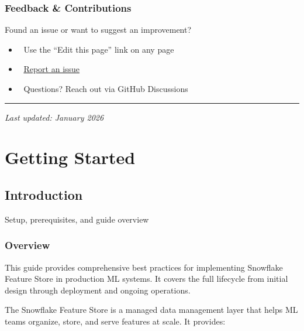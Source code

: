 \documentclass[
  letterpaper,
  DIV=11,
  numbers=noendperiod]{scrreprt}
\providecommand{\tightlist}{%
  \setlength{\itemsep}{0pt}\setlength{\parskip}{0pt}}\usepackage{longtable,booktabs,array}
\begin{document}
\hypertarget{feedback-contributions}{%
\section*{Feedback \& Contributions}\label{feedback-contributions}}


Found an issue or want to suggest an improvement?

\begin{itemize}
\tightlist
\item
  📝 Use the ``Edit this page'' link on any page
\item
  🐛
  \href{https://github.com/snowcat-cloud/FeatureStore_BestPractice/issues}{Report
  an issue}
\item
  💬 Questions? Reach out via GitHub Discussions
\end{itemize}

\begin{center}\rule{0.5\linewidth}{0.5pt}\end{center}

\emph{Last updated: January 2026}

\part{Getting Started}

\hypertarget{introduction}{%
\chapter{Introduction}\label{introduction}}

Setup, prerequisites, and guide overview

\hfill\break

\hypertarget{overview}{%
\section{Overview}\label{overview}}

This guide provides comprehensive best practices for implementing
Snowflake Feature Store in production ML systems. It covers the full
lifecycle from initial design through deployment and ongoing operations.

The Snowflake Feature Store is a managed data management layer that
helps ML teams organize, store, and serve features at scale. It
provides:
\end{document}
